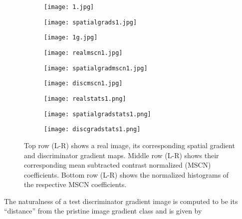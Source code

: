 \documentclass{article}
\begin{document}
\begin{figure*}[!htbp]
\begin{center}
\begin{subfigure}[b]{0.2\textwidth}
\texttt{[image: 1.jpg]}
\end{subfigure}
\begin{subfigure}[b]{0.2\textwidth}
\texttt{[image: spatialgrads1.jpg]}
\end{subfigure}
\begin{subfigure}[b]{0.2\textwidth}
\texttt{[image: 1g.jpg]}
\end{subfigure}
\end{center}
\begin{center}
\begin{subfigure}[b]{0.2\textwidth}
\texttt{[image: realmscn1.jpg]}
\end{subfigure}
\begin{subfigure}[b]{0.2\textwidth}
\texttt{[image: spatialgradmscn1.jpg]}
\end{subfigure}
\begin{subfigure}[b]{0.2\textwidth}
\texttt{[image: discmscn1.jpg]}
\end{subfigure}
\end{center}
\begin{center}
\begin{subfigure}[b]{0.2\textwidth}
\texttt{[image: realstats1.png]}


\end{subfigure}
\begin{subfigure}[b]{0.2\textwidth}
\texttt{[image: spatialgradstats1.png]}
\end{subfigure}
\begin{subfigure}[b]{0.2\textwidth}
\texttt{[image: discgradstats1.png]}
\end{subfigure}
\caption{Top row (L-R) shows a real image, its corresponding spatial gradient and discriminator gradient maps.
Middle row (L-R) shows their corresponding mean subtracted contrast normalized (MSCN) coefficients.
Bottom row (L-R) shows the normalized histograms of the respective MSCN coefficients.}
\label{fig:nss_grad1_22}
\end{center}
\end{figure*}

The naturalness of a test discriminator gradient image  is computed to be its ``distance'' from the pristine image gradient class and is given by
\end{document}
